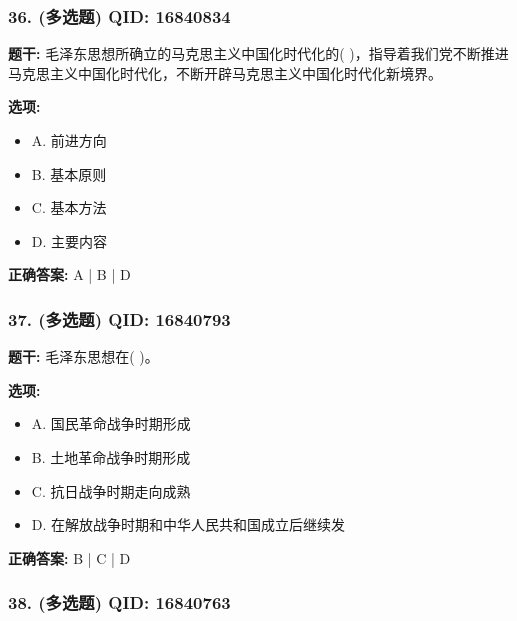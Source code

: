 \documentclass[12pt,UTF8]{ctexart}
\begin{document}
\subsubsection*{36. (多选题) \small QID: 16840834}

\textbf{题干:}
毛泽东思想所确立的马克思主义中国化时代化的( )，指导着我们党不断推进马克思主义中国化时代化，不断开辟马克思主义中国化时代化新境界。

\textbf{选项:}
\begin{itemize}[leftmargin=*]

  \item A. 前进方向

  \item B. 基本原则

  \item C. 基本方法

  \item D. 主要内容

\end{itemize}

\textbf{正确答案:}
A | B | D

\vspace{0.3em}\hrulefill\vspace{0.7em}

\subsubsection*{37. (多选题) \small QID: 16840793}

\textbf{题干:}
毛泽东思想在( )。

\textbf{选项:}
\begin{itemize}[leftmargin=*]

  \item A. 国民革命战争时期形成

  \item B. 土地革命战争时期形成

  \item C. 抗日战争时期走向成熟

  \item D. 在解放战争时期和中华人民共和国成立后继续发

\end{itemize}

\textbf{正确答案:}
B | C | D

\vspace{0.3em}\hrulefill\vspace{0.7em}

\subsubsection*{38. (多选题) \small QID: 16840763}
\end{document}
